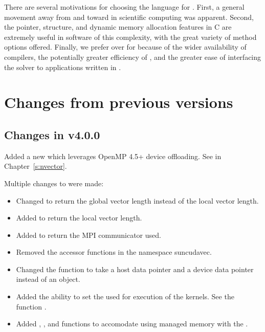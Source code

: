  There are
several motivations for choosing the {\CC} language for {\kinsol}.
First, a general movement away from {\F} and toward {\CC} in
scientific computing was apparent. Second, the pointer, structure,
and dynamic memory allocation features in C are extremely useful
in software of this complexity, with the great variety of method
options offered. Finally, we prefer {\CC} over {\CPP} for {\kinsol}
because of the wider availability of {\CC} compilers, the
potentially greater efficiency of {\CC}, and the greater ease of
interfacing the solver to applications written in {\F}.


\section{Changes from previous versions}

\subsection*{Changes in v4.0.0}

Added a new {\nvector} which leverages OpenMP 4.5+ device offloading.
See {\nvecopenmpdev} in Chapter~\ref{s:nvector}.

Multiple changes to {\nveccuda} were made:
\begin{itemize}
  \item Changed  to return the global vector length instead of
    the local vector length.

  \item Added  to return the local vector length.
  
  \item Added  to return the MPI communicator used.

  \item Removed the accessor functions in the namespace suncudavec.

  \item Changed the  function to take a host data pointer and a device
        data pointer instead of an  object.

  \item Added the ability to set the  used for execution of the
        {\nveccuda} kernels. See the function .
  
  \item Added , , and 
        functions to accomodate using managed memory with the {\nveccuda}.
\end{itemize}

